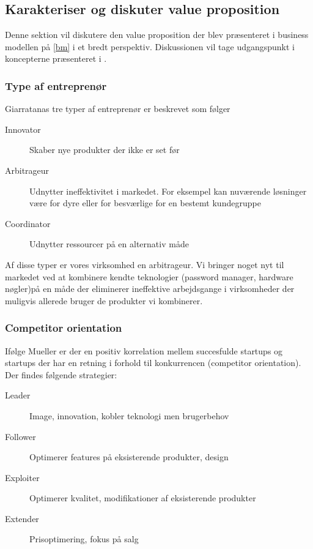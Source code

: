 \subsection{Karakteriser og diskuter value proposition}

Denne sektion vil diskutere den value proposition der blev præsenteret i business modellen på \cref{bm} i et bredt perspektiv.
Diskussionen vil tage udgangspunkt i koncepterne præsenteret i \citet[p.~40]{rose2012software}.

\subsubsection{Type af entreprenør}
Giarratanas tre typer af entreprenør er beskrevet som følger

\begin{description}
	\item[Innovator] Skaber nye produkter der ikke er set før
	\item [Arbitrageur] Udnytter ineffektivitet i markedet. For eksempel kan nuværende løsninger være for dyre eller for besværlige for en bestemt kundegruppe
	\item [Coordinator] Udnytter ressourcer på en alternativ måde
\end{description}

Af disse typer er vores virksomhed en arbitrageur.  
Vi bringer noget nyt til markedet ved at kombinere kendte teknologier (password manager, hardware nøgler)på en måde der eliminerer ineffektive arbejdsgange i virksomheder der muligvis allerede bruger de produkter vi kombinerer.

\subsubsection{Competitor orientation}
Ifølge Mueller \citep[p.~40]{rose2012software} er der en positiv korrelation mellem succesfulde startups og startups der har en retning i forhold til konkurrencen (competitor orientation).
Der findes følgende strategier:
\begin{description}
	\item[Leader] Image, innovation, kobler teknologi men brugerbehov
	\item[Follower] Optimerer features på eksisterende produkter, design
	\item [Exploiter] Optimerer kvalitet, modifikationer af eksisterende produkter
	\item [Extender] Prisoptimering, fokus på salg
\end{description}

